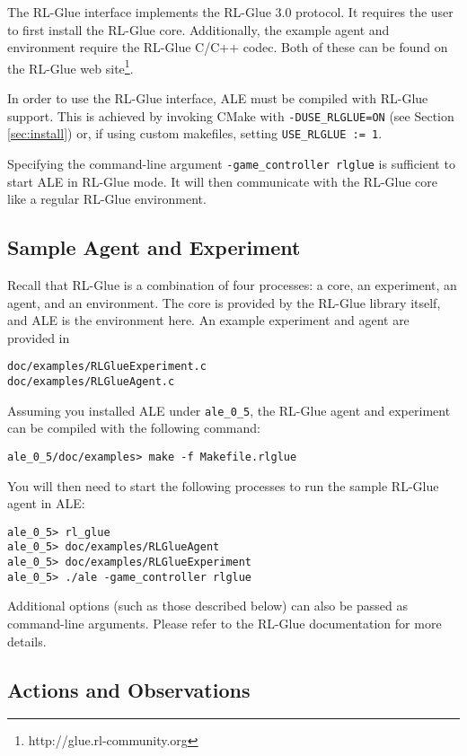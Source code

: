 \documentclass[12pt]{article}
\begin{document}
The RL-Glue interface implements the RL-Glue 3.0 protocol.
It requires the user to first install the RL-Glue core. Additionally, the example agent and 
environment require the RL-Glue C/C++ codec. Both of these can be found on the RL-Glue web
site\footnote{http://glue.rl-community.org}.

In order to use the RL-Glue interface, ALE must be compiled with RL-Glue support. This is achieved
by invoking CMake with \verb+-DUSE_RLGLUE=ON+ (see Section \ref{sec:install}) or, if using
custom makefiles, setting \verb+USE_RLGLUE := 1+. 

Specifying the command-line argument \verb+-game_controller rlglue+ is sufficient to start ALE in 
RL-Glue mode. It will then communicate with the RL-Glue core like a regular RL-Glue environment.

\subsection{Sample Agent and Experiment}

Recall that RL-Glue is a combination of four processes: a core, an experiment, an agent, and
an environment. The core is provided by the RL-Glue library itself, and ALE is the environment
here. An example experiment and agent are provided in 

\begin{verbatim}
doc/examples/RLGlueExperiment.c
doc/examples/RLGlueAgent.c
\end{verbatim}

Assuming you installed ALE under \verb+ale_0_5+, the RL-Glue agent and experiment
can be compiled with the following command: 

\begin{verbatim}
ale_0_5/doc/examples> make -f Makefile.rlglue 
\end{verbatim}

You will then need to start the following processes to run the sample RL-Glue agent in ALE:

\begin{verbatim}
ale_0_5> rl_glue
ale_0_5> doc/examples/RLGlueAgent
ale_0_5> doc/examples/RLGlueExperiment
ale_0_5> ./ale -game_controller rlglue
\end{verbatim}

Additional options (such as those described below) can also be passed as command-line arguments.
Please refer to the RL-Glue documentation for more details. 


\subsection{Actions and Observations}
\end{document}
